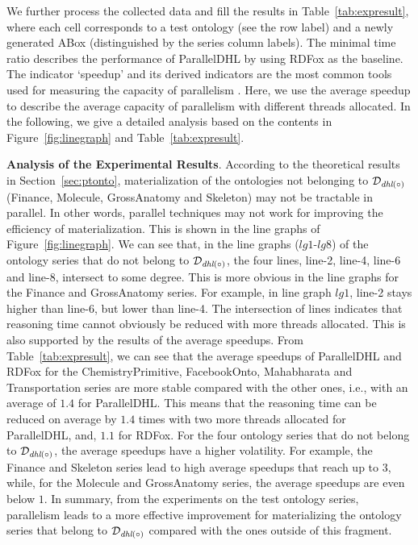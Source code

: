 We further process the collected data and fill the results in Table~\ref{tab:expresult}, where each cell corresponds
to a test ontology (see the row label) and a newly generated ABox
(distinguished by the series column labels).
The minimal time ratio describes the performance of ParallelDHL by using RDFox as the baseline.
The indicator `speedup' and its derived indicators are the most common tools used for measuring the capacity of parallelism \cite{MotikNPHO14,KazakovKS14,UrbaniKMHB12}.
Here, we use the average speedup \cite{ichiyoshiK92} to describe the average capacity of parallelism with different
threads allocated.
In the following, we give a detailed analysis based on the contents in Figure~\ref{fig:linegraph} and Table~\ref{tab:expresult}.

\textbf{Analysis of the Experimental Results}.
According to the theoretical results in Section~\ref{sec:ptonto},
materialization of the
ontologies not belonging to $\mathcal{D}_{\textit{\text{dhl}}(\circ)}$
(Finance, Molecule, GrossAnatomy and Skeleton)
may not be tractable in parallel. In other words,
parallel techniques may not work for improving the efficiency of materialization.
This is shown in the line graphs of Figure~\ref{fig:linegraph}.
We can see that, in the line graphs ($lg1$-$lg8$) of the ontology series
that do not belong to $\mathcal{D}_{\textit{\text{dhl}}(\circ)}$, the four lines, line-2, line-4, line-6 and line-8,
intersect to some degree. This is more obvious in the line graphs for
the Finance and GrossAnatomy
series. For example, in line graph $lg1$,
line-2 stays higher than line-6, but lower than line-4.
The intersection of lines indicates that reasoning time cannot
obviously be reduced with more threads allocated.
This is also supported by the results of the average speedups.
From Table~\ref{tab:expresult}, we can see that the average speedups of ParallelDHL and RDFox
for the ChemistryPrimitive, FacebookOnto, Mahabharata and Transportation series
are more stable compared with the other ones, i.e., with an average of
$1.4$ for ParallelDHL. This means that the reasoning time can be reduced on average
by $1.4$ times with two more threads allocated
for ParallelDHL, and, $1.1$ for RDFox. For the four ontology series
that do not belong to $\mathcal{D}_{\textit{\text{dhl}}(\circ)}$,
the average speedups have a higher volatility. For example,
the Finance and Skeleton series lead to high average speedups that reach up to $3$,
while, for the Molecule and GrossAnatomy series, the average speedups are even below $1$.
In summary, from the experiments on the test ontology series,
parallelism leads to a more effective improvement for materializing the ontology series
that belong to $\mathcal{D}_{\textit{\text{dhl}}(\circ)}$ compared
with the ones outside of this fragment.

